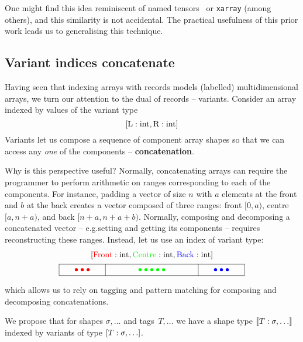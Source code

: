 One might find this idea reminiscent of named tensors~\cite{named-tensors} or \texttt{xarray} \cite{hoyer2017xarray} (among others), and this similarity is not accidental. The practical usefulness of this prior work leads us to generalising this technique.

\subsection{Variant indices concatenate}

Having seen that indexing arrays with records models (labelled) multidimensional arrays, we turn our attention to the dual of records -- variants. 
Consider an array
indexed by values of the variant type
$$\svarianttype{\mathrm{L} : \sint, \mathrm{R} : \sint}$$
Variants let us compose a sequence of component array shapes so that we can access any \textit{one} of the components -- \textbf{concatenation}. 

Why is this perspective useful? Normally, concatenating arrays can require the programmer to perform arithmetic on ranges corresponding to each of the components. For instance, padding a vector of size $n$ with $a$ elements at the front and $b$ at the back creates a vector composed of three ranges: front $[0, a)$, centre $[a, n + a)$, and back $[n + a, n + a + b)$. Normally, composing and decomposing a concatenated vector -- e.g.\@ setting and getting its components -- requires reconstructing these ranges. Instead, let us use an index of variant type:
$$ \begin{array}{c}
\svarianttype{{\color{red} \mathrm{Front}} : \sint, {\color{green} \mathrm{Centre}} : \sint, {\color{blue} \mathrm{Back}} : \sint} \\[0.5em] \begin{tikzpicture}
    \draw (0, 0) -- (8, 0);
    \draw (0, .5) -- (8, .5);
    \draw (0, 0) -- (0, .5);
    \draw (8, 0) -- (8, .5);
    \node[color=red] at (1, .25) {$\bullet\bullet\bullet$};
    \draw (2, 0) -- (2, .5);
    \node[color=green] at (4, .25) {$\bullet\bullet\bullet\bullet\bullet$};
    \draw (6, 0) -- (6, .5);
    \node[color=blue] at (7, .25) {$\bullet\bullet\bullet$};
\end{tikzpicture} 
\end{array} $$
which allows us to rely on tagging and pattern matching for composing and decomposing concatenations.

We propose that for shapes $\sigma, \dots$ and tags~$T, \dots$ we have a shape type $\sconcattype{T : \sigma, \dots}$ indexed by variants of type $\svarianttype{T : \sigma, \dots}$.

